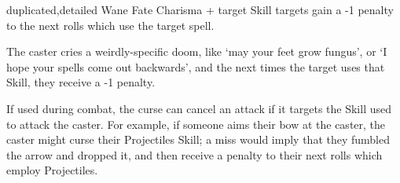   {duplicated,detailed}%
  {Wane}%
  {Fate}%
  {Charisma + target Skill}%
  { targets gain a -1 penalty to the next  rolls which use the target spell.}%
  {The caster cries a weirdly-specific doom, like `may your feet grow fungus', or `I hope your spells come out backwards', and the next  times the target uses that Skill, they receive a -1 penalty.

  If used during combat, the curse can cancel an attack if it targets the Skill used to attack the caster.
  For example, if someone aims their bow at the caster, the caster might curse their Projectiles Skill; a miss would imply that they fumbled the arrow and dropped it, and then receive a penalty to their next  rolls which employ Projectiles.}

